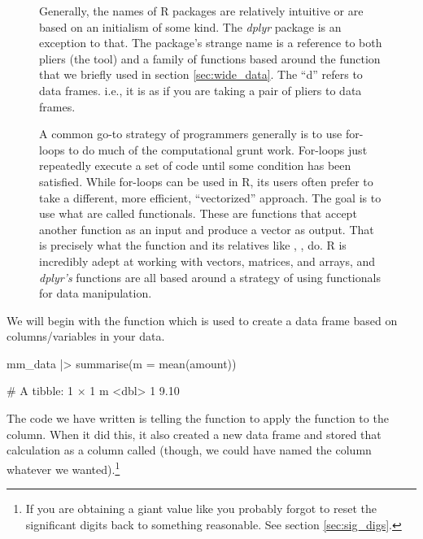 \begin{figure}[h]
    \centering
\begin{mdframed}[style = miscFrame, frametitle = Box 3.1: Why is it called \textit{dplyr}?]

Generally, the names of R packages are relatively intuitive or are based on an initialism of some kind. The \textit{dplyr} package is an exception to that. The package's strange name is a reference to both pliers (the tool) and a family of functions based around the  function that we briefly used in section \ref{sec:wide_data}. The ``d'' refers to data frames. i.e., it is as if you are taking a pair of pliers to data frames.

\vspace{1em}

A common go-to strategy of programmers generally is to use for-loops to do much of the computational grunt work. For-loops just repeatedly execute a set of code until some condition has been satisfied. While for-loops can be used in R, its users often prefer to take a different, more efficient, ``vectorized'' approach. The goal is to use what are called \glspl{functional}. These are functions that accept another function as an input and produce a vector as output. That is precisely what the  function and its relatives like , ,  do. R is incredibly adept at working with vectors, matrices, and arrays, and \textit{dplyr's} functions are all based around a strategy of using functionals for data manipulation.

\end{mdframed}
\end{figure}

We will begin with the  function which is used to create a data frame based on columns/variables in your data.

\begin{inR}
mm_data |> 
  summarise(m = mean(amount))
\end{inR}

\begin{outR}
# A tibble: 1 × 1
      m
  <dbl>
1  9.10
\end{outR}

The code we have written is telling the  function to apply the  function to the  column. When it did this, it also created a new data frame and stored that calculation as a column called  (though, we could have named the column whatever we wanted).\footnote{If you are obtaining a giant value like  you probably forgot to reset the significant digits back to something reasonable. See section \ref{sec:sig_digs}.}

